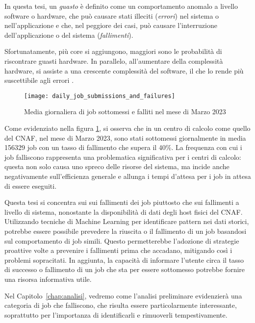 In questa tesi, un \textit{guasto} è definito come un comportamento
anomalo a livello software o hardware, che può causare stati illeciti
(\textit{errori}) nel sistema o nell'applicazione e che, nel peggiore dei
casi, può causare l'interruzione dell'applicazione o del sistema
(\textit{fallimenti}).

Sfortunatamente, più core si aggiungono, maggiori sono le probabilità di
riscontrare guasti hardware. In parallelo, all'aumentare della complessità
hardware, si assiste a una crescente complessità del software, il che lo rende
più suscettibile agli errori \cite{Cappello2014}.

\begin{figure}[!h]
    \begin{center}
        \texttt{[image: daily\_job\_submissions\_and\_failures]}
    \end{center}
    \caption{Media giornaliera di job sottomessi e falliti nel mese di Marzo
    2023}\label{fig:daily_job_submissions_and_failures}
\end{figure}

Come evidenziato nella figura \ref{fig:daily_job_submissions_and_failures}, si
osserva che in un centro di calcolo come quello del CNAF, nel mese di Marzo
2023, sono stati sottomessi giornalmente in media 156329 job con un tasso di
fallimento che supera il 40\%. 
La frequenza con cui i job falliscono rappresenta una problematica
significativa per i centri di calcolo: questa non solo causa uno spreco delle
risorse del sistema, ma incide anche negativamente sull'efficienza generale e
allunga i tempi d'attesa per i job in attesa di essere eseguiti.

Questa tesi si concentra sui sui fallimenti dei job piuttosto che sui
fallimenti a livello di sistema, nonostante la disponibilità di dati degli
host fisici del CNAF. Utilizzando tecniche di Machine Learning per
identificare pattern nei dati storici, potrebbe essere possibile prevedere la
riuscita o il fallimento di un job basandosi sul comportamento di job simili.
Questo permetterebbe l'adozione di strategie proattive volte a prevenire i
fallimenti prima che accadano, mitigando così i problemi sopracitati. In
aggiunta, la capacità di informare l'utente circa il tasso di successo o
fallimento di un job che sta per essere sottomesso potrebbe fornire una
risorsa informativa utile.

Nel Capitolo~\ref{chap:analisi}, vedremo come l'analisi preliminare
evidenzierà una categoria di job che falliscono, che risulta essere
particolarmente interessante, soprattutto per l'importanza di identificarli e
rimuoverli tempestivamente.
